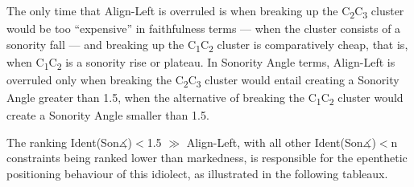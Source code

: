 \documentclass[12pt]{article}
\begin{document}
The only time that {\sc Align-Left} is overruled is when breaking up the C\textsubscript{2}C\textsubscript{3} cluster would be too ``expensive'' in faithfulness terms --- when the cluster consists of a sonority fall --- and breaking up the C\textsubscript{1}C\textsubscript{2} cluster is comparatively cheap, that is, when C\textsubscript{1}C\textsubscript{2} is a sonority rise or plateau. In {\sc Sonority Angle} terms, {\sc Align-Left} is overruled only when breaking the C\textsubscript{2}C\textsubscript{3} cluster would entail creating a {\sc Sonority Angle} greater than 1.5, when the alternative of breaking the C\textsubscript{1}C\textsubscript{2} cluster would create a {\sc Sonority Angle} smaller than 1.5.

The ranking {\sc Ident(Son$\measuredangle$)}$<$1.5 $\gg$ {\sc Align-Left}, with all other {\sc Ident(Son$\measuredangle$)}$<$n constraints being ranked lower than markedness, is responsible for the epenthetic positioning behaviour of this idiolect, as illustrated in the following tableaux.
\end{document}
